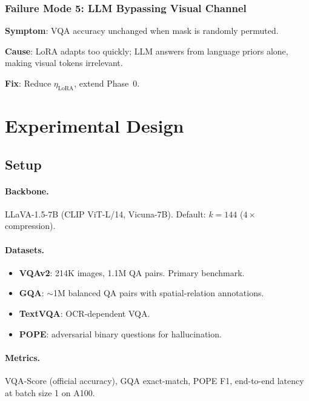 \documentclass[11pt,a4paper]{article}
\begin{document}
\subsubsection{Failure Mode 5: LLM Bypassing Visual Channel}

\begin{warnbox}[title={LLM Language-Prior Bypass}]
\textbf{Symptom}: VQA accuracy unchanged when mask is randomly permuted.

\textbf{Cause}: LoRA adapts too quickly; LLM answers from language priors
alone, making visual tokens irrelevant.

\textbf{Fix}: Reduce $\eta_{\text{LoRA}}$, extend Phase~0.
\end{warnbox}

\section{Experimental Design}
\label{sec:experiments}

\subsection{Setup}

\paragraph{Backbone.}
LLaVA-1.5-7B (CLIP ViT-L/14, Vicuna-7B).
Default: $k = 144$ ($4\times$ compression).

\paragraph{Datasets.}
\begin{itemize}[leftmargin=1.5em, itemsep=1pt]
  \item \textbf{VQAv2}: 214K images, 1.1M QA pairs. Primary benchmark.
  \item \textbf{GQA}: $\sim$1M balanced QA pairs with spatial-relation
    annotations.
  \item \textbf{TextVQA}: OCR-dependent VQA.
  \item \textbf{POPE}: adversarial binary questions for hallucination.
\end{itemize}

\paragraph{Metrics.}
VQA-Score (official accuracy), GQA exact-match, POPE F1, end-to-end
latency at batch size 1 on A100.
\end{document}
